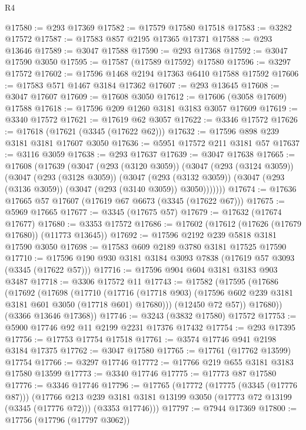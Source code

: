 \begin{lexlean}{R4}
\begin{coremodule}
@17580 := @293 @17369
@17582 := @17579 @17580 @17518
@17583 := @3282 @17572
@17587 := @17583 @857 @2195 @17365 @17371
@17588 := @293 @13646
@17589 := @3047 @17588
@17590 := @293 @17368
@17592 := @3047 @17590 @3050
@17595 := @17587 (@17589 @17592) @17580
@17596 := @3297 @17572
@17602 := @17596 @1468 @2194 @17363 @6410 @17588 @17592
@17606 := @17583 @571 @1467 @3184 @17362
@17607 := @293 @13645
@17608 := @3047 @17607
@17609 := @17608 @3050
@17612 := @17606 (@3058 @17609) @17588
@17618 := @17596 @209 @1260 @3181 @3183 @3057 @17609
@17619 := @3340 @17572
@17621 := @17619 @62 @3057
@17622 := @3346 @17572
@17626 := @17618 (@17621 (@3345 (@17622 @62)))
@17632 := @17596 @898 @239 @3181 @3181 @17607 @3050
@17636 := @5951 @17572 @211 @3181 @57
@17637 := @3116 @3059
@17638 := @293 @17637
@17639 := @3047 @17638
@17665 := @17608
    (@17639
      (@3047
        (@293 (@3120 @3059))
        (@3047
          (@293 (@3124 @3059))
          (@3047
            (@293 (@3128 @3059))
            (@3047
              (@293 (@3132 @3059))
              (@3047 (@293 (@3136 @3059)) (@3047 (@293 (@3140 @3059)) @3050)))))))
@17674 := @17636 @17665 @57 @17607 (@17619 @67 @6673 (@3345 (@17622 @67)))
@17675 := @5969 @17665
@17677 := @3345 (@17675 @57)
@17679 := @17632 (@17674 @17677)
@17680 := @3353 @17572
@17686 := @17602 (@17612 (@17626 (@17679 @17680)) (@11773 @13645))
@17692 := @17596 @2192 @239 @5818 @3181 @17590 @3050
@17698 := @17583 @609 @2189 @3780 @3181 @17525 @17590
@17710 := @17596 @190 @930 @3181 @3184 @3093 @7838 (@17619 @57 @3093 (@3345 (@17622 @57)))
@17716 := @17596 @904 @604 @3181 @3183 @903 @3487
@17718 := @3306 @17572 @11
@17743 := @17582
    (@17595
      (@17686
        (@17692
          (@17698
            (@17710
              (@17716 (@17718 @903) (@17596 @602 @239 @3181 @3181 @601 @3050 (@17718 @601) @17680)))
            (@12450 @72 @57))
          @17680))
      (@3366 @13646 @17368))
@17746 := @3243 (@3832 @17580) @17572
@17753 := @5900 @17746 @92 @11 @2199 @2231 @17376 @17432
@17754 := @293 @17395
@17756 := @17753 @17754 @17518
@17761 := @3574 @17746 @941 @2198 @3184 @17375
@17762 := @3047 @17580
@17765 := @17761 (@17762 @13599) @17754
@17766 := @3297 @17746
@17772 := @17766 @219 @655 @3181 @3183 @17580 @13599
@17773 := @3340 @17746
@17775 := @17773 @87 @17580
@17776 := @3346 @17746
@17796 := @17765
    (@17772
      (@17775 (@3345 (@17776 @87)))
      (@17766
        @213
        @239
        @3181
        @3181
        @13199
        @3050
        (@17773 @72 @13199 (@3345 (@17776 @72)))
        (@3353 @17746)))
@17797 := @7944 @17369
@17800 := @17756 (@17796 (@17797 @3062))

\end{coremodule}
\end{lexlean}
